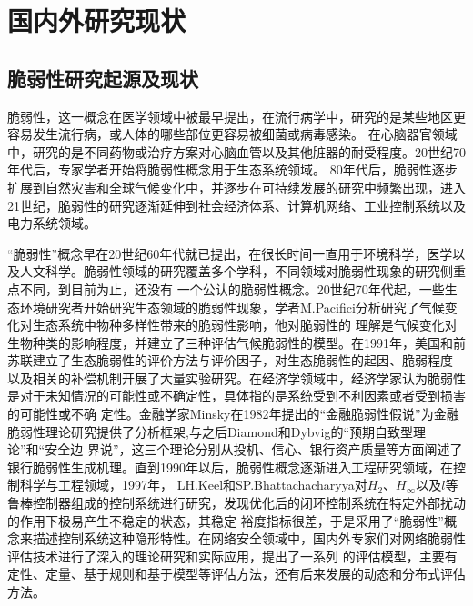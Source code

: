 \section{国内外研究现状}
\label{sec:research_presentSituation}

\subsection{脆弱性研究起源及现状}
\label{sec:origin}
脆弱性，这一概念在医学领域中被最早提出，在流行病学\cite{refs2,refs3}中，研究的是某些地区更容易发生流行病，或人体的哪些部位更容易被细菌或病毒感染。
在心脑器官领域中，研究的是不同药物或治疗方案对心脑血管以及其他脏器的耐受程度\cite{refs4,refs5}。20世纪70年代后，专家学者开始将脆弱性概念用于生态系统领域\cite{refs6,refs7}。
80年代后，脆弱性逐步扩展到自然灾害和全球气候变化中，并逐步在可持续发展的研究中频繁出现，进入21世纪，脆弱性的研究逐渐延伸到社会经济体系、计算机网络、工业控制系统以及
电力系统领域。

“脆弱性”概念早在20世纪60年代就已提出，在很长时间一直用于环境科学，医学以及人文科学。脆弱性领域的研究覆盖多个学科，不同领域对脆弱性现象的研究侧重点不同，到目前为止，还没有
一个公认的脆弱性概念。20世纪70年代起，一些生态环境研究者开始研究生态领域的脆弱性现象，学者M.Pacifici分析研究了气候变化对生态系统中物种多样性带来的脆弱性影响，他对脆弱性的
理解是气候变化对生物种类的影响程度，并建立了三种评估气候脆弱性的模型\cite{refs8}。在1991年，美国和前苏联建立了生态脆弱性的评价方法与评价因子，对生态脆弱性的起因、脆弱程度
以及相关的补偿机制开展了大量实验研究\cite{refs9}。在经济学领域中，经济学家认为脆弱性是对于未知情况的可能性或不确定性，具体指的是系统受到不利因素或者受到损害的可能性或不确
定性\cite{refs10,refs11}。金融学家Minsky在1982年提出的“金融脆弱性假说”为金融脆弱性理论研究提供了分析框架\cite{refs12},与之后Diamond和Dybvig的“预期自致型理论”和“安全边
界说”\cite{refs13}，这三个理论分别从投机、信心、银行资产质量等方面阐述了银行脆弱性生成机理。直到1990年以后，脆弱性概念逐渐进入工程研究领域，在控制科学与工程领域，1997年，
LH.Keel和SP.Bhattachacharyya对$H_{2}$、$H_{\infty}$以及$l$等鲁棒控制器组成的控制系统进行研究，发现优化后的闭环控制系统在特定外部扰动的作用下极易产生不稳定的状态，其稳定
裕度指标很差，于是采用了“脆弱性”概念来描述控制系统这种隐形特性\cite{refs14}。在网络安全领域中，国内外专家们对网络脆弱性评估技术进行了深入的理论研究和实际应用，提出了一系列
的评估模型，主要有定性、定量、基于规则和基于模型等评估方法，还有后来发展的动态和分布式评估方法\cite{refs15,refs16}。

